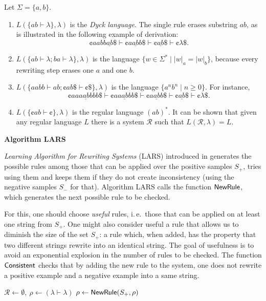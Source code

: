 \begin{example}
Let $\Sigma = \{a, b\}$.
\begin{enumerate}
\item $L(\{ab \vdash \lambda\}, \lambda)$ is the \emph{Dyck language}. The single rule erases substring $ab$, as is illustrated in the following example of derivation:
$$\cent aabb \underline{ab} \$ \vdash
\cent a \underline{ab} b \$ \vdash
\cent \underline{ab} \$ \vdash
\cent \lambda \$.$$
\item $L(\{ab \vdash \lambda; ba \vdash \lambda\}, \lambda)$ is the language $\{w \in \Sigma^* \mid |w|_a = |w|_b\}$, because every rewriting step erases one $a$ and one $b$.
\item $L(\{aabb \vdash ab; \cent ab \$ \vdash \cent \$\}, \lambda)$ is the language $\{a^n b^n \mid n \ge 0\}$. For instance,
$$\cent aa \underline{aabb} bb \$ \vdash
\cent a \underline{aabb} b \$ \vdash
\cent \underline{aabb} \$ \vdash
\cent \underline{ab} \$ \vdash
\cent \lambda \$.$$
\item $L(\{\cent ab \vdash \cent \}, \lambda)$ is the regular language $(ab)^*$. It can be shown that given any regular language $L$ there is a system $\mathcal{R}$ such that $L(\mathcal{R}, \lambda) = L$.
\end{enumerate}
\end{example}

{\bf Algorithm LARS}\label{section:lars}

\emph{Learning Algorithm for Rewriting Systems} (LARS) introduced in \citep{Eyraud2007} generates the possible rules among those that can be applied over the positive samples $S_+$, tries using them and keeps them if they do not create inconsistency (using the negative samples $S_-$ for that). Algorithm LARS calls the function \index{$\NewRule$}$\NewRule$, which generates the next possible rule to be checked.

For this, one should choose \emph{useful} rules, i.\,e.\ those that can be applied on at least one string from $S_+$. One might also consider useful a rule that allows us to diminish the size of the set $S_+$: a rule which, when added, has the property that two different strings rewrite into an identical string. The goal of usefulness is to avoid an exponential explosion in the number of rules to be checked. The function \index{$\Consistent$}$\Consistent$ checks that by adding the new rule to the system, one does not rewrite a positive example and a negative example into a same string.

\begin{algorithm}
\caption{Learning algorithm $\mathsf{LARS}(S_+, S_-)$}
\label{algorithm:lars}
\LinesNumbered
{}
$\mathcal{R} \gets \emptyset,\ \rho \gets (\lambda \vdash \lambda)$\;
{$\rho \gets \textup{\sf NewRule}(S_+, \rho)$\;
}
\;
\end{algorithm}

